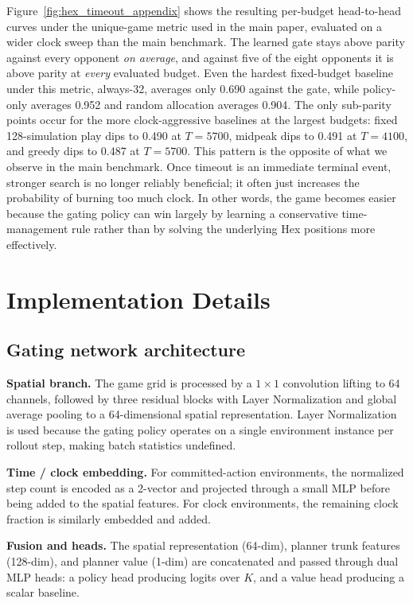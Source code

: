 \documentclass{article}
\begin{document}
Figure~\ref{fig:hex_timeout_appendix} shows the resulting per-budget head-to-head
curves under the unique-game metric used in the main paper, evaluated on a wider
clock sweep than the main benchmark. The learned gate stays
above parity against every opponent \emph{on average}, and against five of the eight
opponents it is above parity at \emph{every} evaluated budget. Even the hardest
fixed-budget baseline under this metric, always-32, averages only 0.690 against the
gate, while policy-only averages 0.952 and random allocation averages 0.904. The
only sub-parity points occur for the more clock-aggressive baselines at the largest
budgets: fixed 128-simulation play dips to 0.490 at $T{=}5700$, midpeak dips to
0.491 at $T{=}4100$, and greedy dips to 0.487 at $T{=}5700$. This pattern is the
opposite of what we observe in the main benchmark. Once timeout is an immediate
terminal event, stronger search is no longer reliably beneficial; it often just
increases the probability of burning too much clock. In other words, the game becomes
easier because the gating policy can win largely by learning a conservative
time-management rule rather than by solving the underlying Hex positions more
effectively.


\section{Implementation Details}
\label{app:implementation}

\subsection{Gating network architecture}

\textbf{Spatial branch.}
The game grid is processed by a $1{\times}1$ convolution lifting to 64 channels,
followed by three residual blocks with Layer Normalization and global average pooling
to a 64-dimensional spatial representation.
Layer Normalization is used because the gating policy operates on a single environment
instance per rollout step, making batch statistics undefined.

\textbf{Time / clock embedding.}
For committed-action environments, the normalized step count is encoded as a 2-vector
and projected through a small MLP before being added to the spatial features.
For clock environments, the remaining clock fraction is similarly embedded and added.

\textbf{Fusion and heads.}
The spatial representation (64-dim), planner trunk features (128-dim), and planner
value (1-dim) are concatenated and passed through dual MLP heads: a policy head
producing logits over $K$, and a value head producing a scalar baseline.
\end{document}
